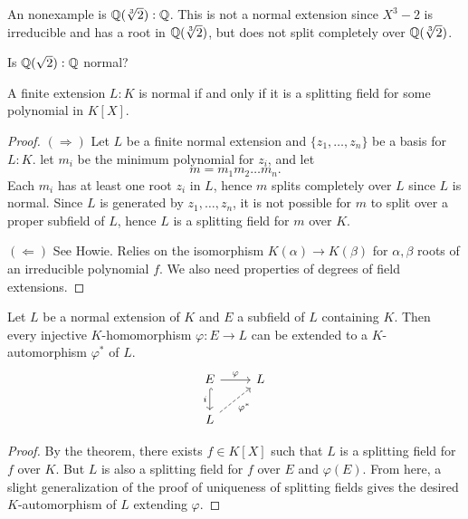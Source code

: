 \begin{example}
  An nonexample is $\mathbb{Q}(\sqrt[3]{2}) : \mathbb{Q}$. This is not
  a normal extension since $X^3 - 2$ is irreducible
  and has a root in $\mathbb{Q}(\sqrt[3]{2})$, but does not
  split completely over $\mathbb{Q}(\sqrt[3]{2})$.
\end{example}

\begin{remark}
  Is $\mathbb{Q}(\sqrt{2}) : \mathbb{Q}$ normal?
\end{remark}

\begin{theorem}
  A finite extension $L : K$ is normal if and only if
  it is a splitting field for some polynomial in $K[X]$.
\end{theorem}

\begin{proof}
  $(\Rightarrow)$ Let $L$ be a finite normal extension
  and $\{z_1, \dots, z_n\}$ be a basis for $L : K$.
  let $m_i$ be the minimum polynomial for $z_i$, and
  let
  \[
    m = m_1 m_2 \dots m_n.
  \]
  Each $m_i$ has at least one root $z_i$ in $L$, hence
  $m$ splits completely over $L$ since $L$ is normal.
  Since $L$ is generated by $z_1, \dots, z_n$, it is
  not possible for $m$ to split over a proper subfield
  of $L$, hence $L$ is a splitting field for $m$ over $K$.

  $(\Leftarrow)$ See Howie. Relies on the isomorphism
  $K(\alpha) \to K(\beta)$ for $\alpha, \beta$ roots
  of an irreducible polynomial $f$. We also need
  properties of degrees of field extensions.
\end{proof}

\begin{corollary}
  Let $L$ be a normal extension of $K$ and $E$ a
  subfield of $L$ containing $K$. Then every injective
  $K$-homomorphism $\varphi : E \to L$ can be extended to
  a $K$-automorphism $\varphi^*$ of $L$.
\[
  \begin{tikzcd}
    E \dar[hook, swap, "i"] \rar{\varphi} & L \\
    L \urar[dashed, "\varphi^*"'] &
  \end{tikzcd}
\]
\end{corollary}

\begin{proof}
  By the theorem, there exists $f \in K[X]$ such that
  $L$ is a splitting field for $f$ over $K$. But
  $L$ is also a splitting field for $f$ over $E$ and
  $\varphi(E)$. From here, a slight generalization of the
  proof of uniqueness of splitting fields gives
  the desired $K$-automorphism of $L$ extending $\varphi$.
\end{proof}

